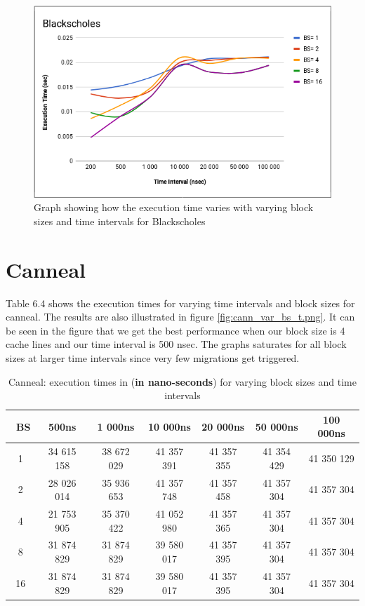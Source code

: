 \documentclass{listhesis}
\begin{document}
\begin{figure}
  \includegraphics[width=\linewidth]{Blacksc_var_bs_t.png}
  \centering
  \caption{Graph showing how the execution time varies with varying block sizes and time intervals for Blackscholes}
  \label{fig:Blacksc_var_bs_t.png}
\end{figure}

\section{Canneal}
Table 6.4 shows the execution times for varying time intervals and block sizes for canneal. The results are also illustrated in figure \ref{fig:cann_var_bs_t.png}. It can be seen in the figure that we get the best performance when our block size is 4 cache lines and our time interval is 500 nsec. The graphs saturates for all block sizes at larger time intervals since very few migrations get triggered. 

\begin{table}[h!]
\begin{center}
 \begin{tabular}{|| c | c | c| c | c | c | c||} 
 \hline
 \ \textbf{BS}  & \textbf{500ns}  & \textbf{1 000ns} & \textbf{10 000ns} & \textbf{20 000ns} & \textbf{50 000ns} & \textbf{100 000ns}\\ [0.5 ex] 
 \hline\hline
   1 & 34 615 158 &  38 672 029 & 41 357 391 & 41 357 355 & 41 354 429 &  41 350 129 \\ 
 \hline
   2 & 28 026 014 & 35 936 653 & 41 357 748 & 41 357 458 & 41 357 304 & 41 357 304 \\
 \hline
   4 & 21 753 905 & 35 370 422 & 41 052 980 & 41 357 365 & 41 357 304 & 41 357 304 \\
 \hline
   8 & 31 874 829 & 31 874 829 & 39 580 017 & 41 357 395 & 41 357 304 & 41 357 304 \\
  \hline
   16 & 31 874 829 & 31 874 829 & 39 580 017 & 41 357 395 & 41 357 304 & 41 357 304 \\
    \hline
\end{tabular}
 \caption{Canneal: execution times in (\textbf{in nano-seconds}) for varying block sizes and time intervals}
 \label{table:ExecTimes2}
\end{center}
\end{table}
\end{document}
